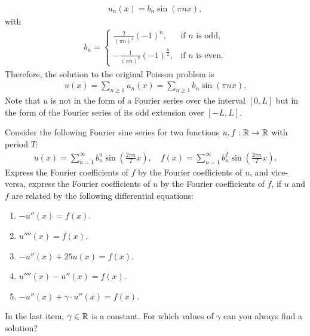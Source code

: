 \documentclass[11pt]{article}
\begin{document}
\begin{solution}
\begin{itemize}
    \begin{align*}
        u_n(x) = b_n \sin(\pi n x),
    \end{align*}
    with
    \begin{align*}
        b_n = \begin{cases}
            \frac{2}{(\pi n)^4} (-1)^n, & \text{if } n \text{ is odd},\\
            -\frac{1}{(\pi n)^3}(-1)^{\frac n 2}, & \text{if } n \text{ is even}.
        \end{cases}
    \end{align*}
    Therefore, the solution to the original Poisson problem is
    \begin{align*}
        u(x) = \sum_{n \geq 1} u_n(x) = \sum_{n \geq 1} b_n \sin(\pi n x).
    \end{align*}
    Note that $u$ is not in the form of a Fourier series over the interval $[0, L]$ but in the form of the Fourier series of its odd extension over $[-L, L]$. 
\end{itemize}
\end{solution}














\begin{exercise}
    Consider the following Fourier sine series for two functions $u, f : \mathbb{R} \to \mathbb{R}$ with period $T$:
    \begin{align*}
        u(x) = \sum_{n=1}^{\infty} b_{n}^{u} \sin\left( \frac{2\pi n}{T} x \right)
        ,
        \quad 
        f(x) = \sum_{n=1}^{\infty} b_{n}^{f} \sin\left( \frac{2\pi n}{T} x \right)
        .
    \end{align*}
    Express the Fourier coefficients of $f$ by the Fourier coefficients of $u$, and vice-versa, express the Fourier coefficients of $u$ by the Fourier coefficients of $f$,
    if $u$ and $f$ are related by the following differential equations:
    \begin{enumerate}[label=(\alph*)]
     \item 
     $-u''(x) = f(x)$.
     \item 
     $u''''(x) = f(x)$.
     \item 
     $-u''(x) + 25 u(x) = f(x)$.
     \item 
     $u''''(x) - u''(x) = f(x)$.
     \item 
     $-u''(x) + \gamma \cdot u''(x) = f(x)$.
    \end{enumerate}
    In the last item, $\gamma \in \mathbb{R}$ is a constant. For which values of $\gamma$ can you always find a solution?
\end{exercise}
\begin{solution}     
\end{solution}
\end{document}
